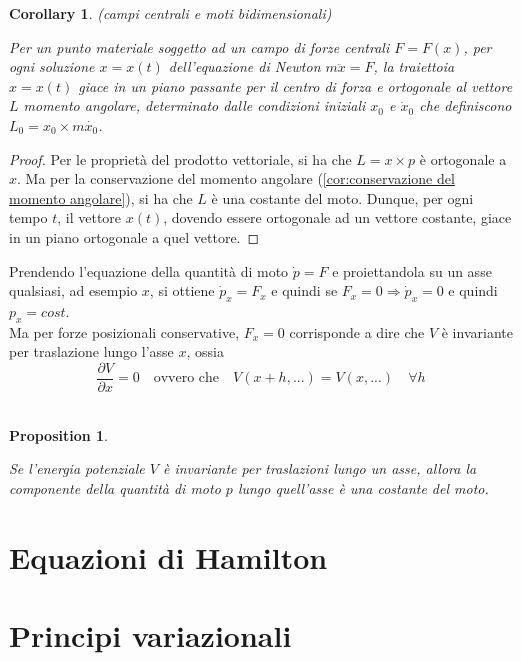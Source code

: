 \documentclass{article}
\newtheorem{corollary}{Corollary}[theorem]
\newtheorem{proposition}{Proposition}[section]
\begin{document}
            \begin{corollary}(campi centrali e moti bidimensionali)
                \label{cor:campi centrale e moti bidimensionali}

                Per un punto materiale soggetto ad un campo di forze centrali $F = F(x)$, per ogni soluzione $x = x(t)$ dell'equazione di Newton $m \ddot{x} = F$, 
                la traiettoia $x = x(t)$ giace in un piano passante per il centro di forza e ortogonale al vettore $L$ momento angolare, determinato dalle 
                condizioni iniziali $x_0$ e $\dot{x}_0$ che definiscono $L_0 = x_0 \times m \dot{x_0}$.

            \end{corollary}
            \begin{proof}
                
                Per le proprietà del prodotto vettoriale, si ha che $L = x \times p$ è ortogonale a $x$. Ma per la conservazione del momento angolare (\ref{cor:conservazione del momento angolare}),
                si ha che $L$ è una costante del moto. Dunque, per ogni tempo $t$, il vettore $x(t)$, dovendo essere ortogonale ad un vettore costante, giace in un piano ortogonale a quel vettore.

            \end{proof}

            Prendendo l'equazione della quantità di moto $\dot{p} = F$ e proiettandola su un asse qualsiasi, ad esempio $x$, si ottiene $\dot{p}_x = F_x$ e 
            quindi se $F_x = 0 \Longrightarrow \dot{p}_x = 0$ e quindi $p_x = cost$. \\
            Ma per forze posizionali conservative, $F_x = 0$ corrisponde a dire che $V$ è invariante per traslazione lungo l'asse $x$, ossia 
            \[ \frac{\partial V}{\partial x} = 0 \quad \textrm{ovvero che} \quad V(x + h, ...) = V(x, ...) \quad \forall h \] \\
            \begin{proposition}
                \label{prop:simmetrie e conservazioni}

                Se l'energia potenziale $V$ è invariante per traslazioni lungo un asse, allora la componente della quantità di moto $p$ lungo quell'asse è una costante del moto.

            \end{proposition}



    \clearpage
    \section{Equazioni di Hamilton}

    \clearpage
    \section{Principi variazionali}
\end{document}
